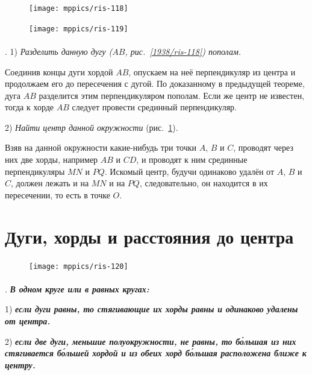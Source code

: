 \documentclass[oneside]{book}
\begin{document}
{

\begin{figure}
\centering
\bigskip
\texttt{[image: mppics/ris-118]}
\caption{}\label{1938/ris-118}
\bigskip
\texttt{[image: mppics/ris-119]}
\caption{}\label{1938/ris-119}
\end{figure}

\paragraph{}\label{1938/108}
\mbox{.}
1) \emph{Разделить данную дугу \emph{($AB$, рис.~\ref{1938/ris-118})} пополам.}

Соединив концы дуги хордой $AB$, опускаем на неё перпендикуляр из центра и продолжаем его до пересечения с дугой.
По доказанному в предыдущей теореме, дуга $AB$ разделится этим перпендикуляром пополам.
Если же центр не известен, тогда к хорде $AB$ следует провести срединный перпендикуляр. 

2) \emph{Найти центр данной окружности} (рис.~\ref{1938/ris-119}).

Взяв на данной окружности какие-нибудь три точки $A$, $B$ и $C$, проводят через них две хорды, например $AB$ и $CD$, и проводят к ним срединные перпендикуляры $MN$ и $PQ$. 
Искомый центр, будучи одинаково удалён от $A$, $B$ и $C$, должен лежать и на $MN$ и на $PQ$, следовательно, он находится в их пересечении, то есть в точке $O$.

}

\section{Дуги, хорды и расстояния до центра}

\begin{figure}
\centering
\texttt{[image: mppics/ris-120]}
\caption{}\label{1938/ris-120}
\end{figure}

\paragraph{}\label{1938/109}
\mbox{.}
\textbf{\emph{В одном круге или в равных кругах:}}

1) \textbf{\emph{если дуги равны, то стягивающие их хорды равны и одинаково удалены от центра.}}

2) \textbf{\emph{если две дуги, меньшие полуокружности, не равны, то б\'{о}льшая из них стягивается б\'{о}льшей хордой и из обеих хорд б\'{о}льшая расположена ближе к центру.}}
\end{document}
